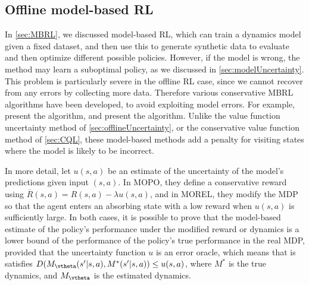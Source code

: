 

     
\subsection{Offline model-based RL}
\label{sec:offlineMBRL}


In \cref{sec:MBRL}, we discussed model-based RL,
which can train a dynamics model given a fixed dataset,
and then use this to generate synthetic data
to evaluate and then optimize  different possible policies.
However, if the model is wrong, the method may learn a suboptimal
policy, as we discussed in \cref{sec:modelUncertainty}.
This problem is particularly severe in the offline RL case,
since we cannot recover from any errors by collecting more data.
Therefore various conservative MBRL algorithms have been developed,
to avoid exploiting model errors.
For example, \citep{Kidambi2020} present the
 algorithm,
and \citep{Yu2020mopo} present the  algorithm.
Unlike the
value function uncertainty method of \cref{sec:offlineUncertainty},
or the conservative value function method of \cref{sec:CQL},
these model-based methods add a penalty for visiting states where
the model is likely to be incorrect.

In more detail, let $u(s,a)$ be an estimate of the uncertainty of the
model's predictions given input $(s,a)$.
In MOPO, they define a conservative reward using
$\overline{R}(s,a) = R(s,a) - \lambda u(s,a)$,
and in MOREL, they modify the MDP so that the agent enters an
absorbing state with a low reward when $u(s,a)$ is sufficiently
large.
In both cases, it is possible to prove that the model-based
estimate of the policy's performance under the modified
reward or dynamics is a lower bound of the performance
of the policy's true performance in the real MDP,
provided that the uncertainty function $u$ is an error oracle,
which means that is satisfies
$D(M_{\vtheta}(s'|s,a), M^*(s'|s,a)) \leq u(s,a)$,
where $M^*$ is the true dynamics, and $M_{\vtheta}$
is the estimated dynamics.

